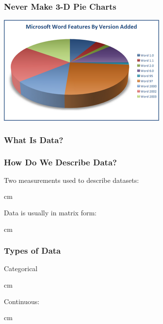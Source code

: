 \documentclass{beamer} %
\begin{document}
\begin{frame}\frametitle{Never Make 3-D Pie Charts}
	\centering
	\includegraphics[width=0.87\linewidth]{3dpie.png}
\end{frame}



\begin{frame}\frametitle{What Is Data?}
	\centering
	
\end{frame}


\begin{frame}\frametitle{How Do We Describe Data?}
	Two measurements used to describe datasets:
	
	 cm
	
	Data is usually in matrix form:
	
	 cm
	
\end{frame}


\begin{frame}\frametitle{Types of Data}
	Categorical
	
	 cm
	
	Continuous:
	
	 cm
	
\end{frame}
\end{document}
